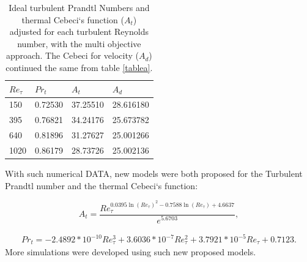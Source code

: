 \documentclass[10pt]{article} %
\begin{document}
\begin{table}[!h]
	\centering
	\caption{Ideal turbulent Prandtl Numbers and thermal Cebeci`s function ($A_t$) adjusted for each turbulent Reynolds number, with the multi objective approach. The Cebeci for velocity ($A_d$) continued the same from table \ref{tablea}. }
	\begin{tabular}{llll}
		\hline
		$Re_\tau$ & $Pr_t$ & $A_t$ & $A_d$\\
		\hline
		150  &   0.72530 & 37.25510 & 28.616180\\
		395  &   0.76821 & 34.24176 & 25.673782\\
		640  &   0.81896 & 31.27627 & 25.001266\\
		1020 &   0.86179 & 28.73726 & 25.002136\\ 
		\hline
	\end{tabular}
\end{table}
With such numerical DATA, new models were both proposed for the Turbulent Prandtl number and the thermal Cebeci`s function:

\begin{equation}
A_t = \frac{Re_\tau ^{0.0395 \ln(Re_\tau)^2 - 0.7588 \ln(Re_\tau) +  4.6637  } }{e ^{5.6703}},
\end{equation}

\begin{equation}
\begin{split}
Pr_t = -2.4892 * 10^{-10} Re_\tau^3 +  3.6036 * 10^{-7} Re_\tau^2 + 3.7921 *10 ^{-5} Re_\tau + 0.7123 .
\end{split}
\end{equation}
More simulations were developed using such new proposed models.
\end{document}
